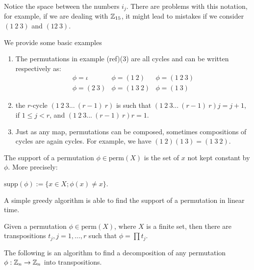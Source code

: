 Notice the space between the numbers $i_j$. There are problems with this notation, for example, if we are dealing with $\mathbb{Z}_{15}$, it might lead to mistakes if we consider $(1\ 2\ 3)$ and $(12\ 3)$.


\begin{exmp}
	We provide some basic examples
	\begin{enumerate}
		\item 	The permutations in example (ref)(3) are all cycles and can be written respectively as:
		$$\begin{array}{ccc}
		\phi = \iota	& \phi = (1\ 2) & \phi = (1\ 2\ 3) \\ 
		\phi =(2\ 3) & \phi = (1\ 3\ 2) & \phi = (1\ 3)
		\end{array}$$ 
		
		\item the $r$-cycle $(1\ 2\ 3...\ (r-1)\ r)$ is such that $ (1\ 2\ 3...\ (r-1)\ r)j = j+1$, if $1 \leq j < r$, and $(1\ 2\ 3...\ (r-1)\ r)r=1$.
		
		\item Just as any map, permutations can be composed, sometimes compositions of cycles are again cycles. For example, we have $(1 \ 2)(1 \ 3) = (1 \ 3 \ 2)$. 
	\end{enumerate}
	
\end{exmp}


\begin{definition}
	The support of a permutation $\phi \in \text{perm}(X)$ is the set of $x$ not kept constant by $\phi$. More precisely:
	
	\begin{center}
		$\text{supp}(\phi) := \{x \in X; \phi(x)\neq x  \}$.
	\end{center}
\end{definition}

\begin{lemma}
	A simple greedy algorithm is able to find the support of a permutation in linear time.	
\end{lemma}

\begin{proposition}
	Given a permutation $\phi \in \text{perm}(X)$, where $X$ is a finite set, then there are transpositions $t_j, j=1,...,r$ such that $\phi = \prod t_j$.
\end{proposition}

\begin{algo}
	The following is an algorithm to find a decomposition of any permutation $\phi: \mathbb{Z}_n \rightarrow \mathbb{Z}_n$ into transpositions.
	
	
	
\end{algo}


